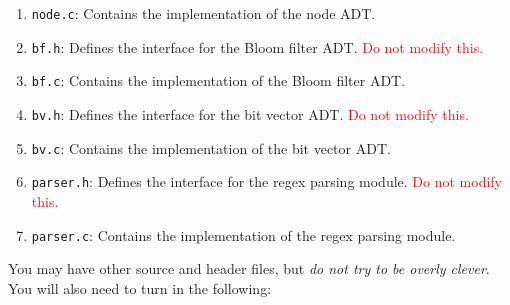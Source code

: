 \begin{enumerate}
  \item \texttt{node.c}: Contains the implementation of the node ADT.

  \item \texttt{bf.h}: Defines the interface for the Bloom filter ADT.
    \textcolor{red}{Do not modify this.}

  \item \texttt{bf.c}: Contains the implementation of the Bloom filter
    ADT.

  \item \texttt{bv.h}: Defines the interface for the bit vector ADT.
    \textcolor{red}{Do not modify this.}

  \item \texttt{bv.c}: Contains the implementation of the bit vector
    ADT.

  \item \texttt{parser.h}: Defines the interface for the regex parsing
    module. \textcolor{red}{Do not modify this.}

  \item \texttt{parser.c}: Contains the implementation of the regex
    parsing module.
\end{enumerate}

You may have other source and header files, but \emph{do not try to be
overly clever}. You will also need to turn in the following:

